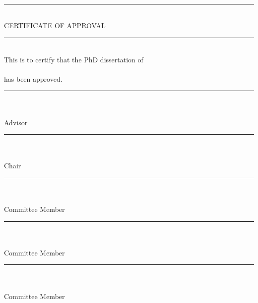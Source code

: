 \vspace*{\fill}
\begin{center}
\track{}\\
\school{}\\
\institution{}\\
\doublespaced
\rule{8cm}{1pt}\\
CERTIFICATE OF APPROVAL\\
\rule{8cm}{1pt}\\
\singlespaced
This is to certify that the PhD dissertation of\\
\projectauthor{}\\
has been approved.\\

\vspace{30pt}
\rule{8cm}{0.5pt}\\
\advisor\\
Advisor\\

\vspace{30pt}
\rule{8cm}{0.5pt}\\
\chair\\
Chair\\

\vspace{30pt}
\rule{8cm}{0.5pt}\\
\memberthree\\
Committee Member\\

\vspace{30pt}
\rule{8cm}{0.5pt}\\
\memberfour\\
Committee Member\\

\vspace{30pt}
\rule{8cm}{0.5pt}\\
\memberfive\\
Committee Member\\

\end{center}
\vspace*{\fill}
\clearpage